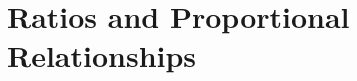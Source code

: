 \documentclass[12pt, fleqn, openany, oneside]{studyGuide}
\begin{document}

\chapter{Ratios and Proportional Relationships}








\printAnswerKey
\end{document}
